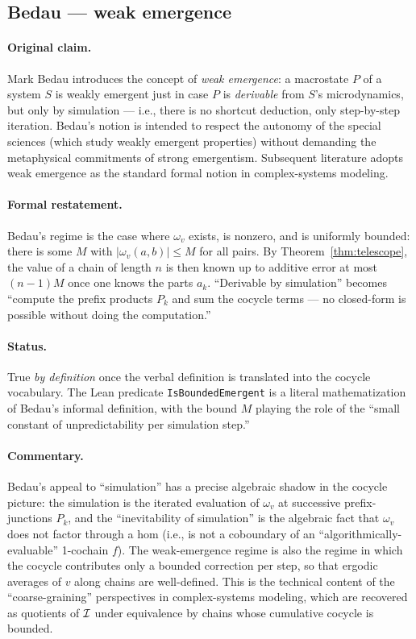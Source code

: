 \subsection{Bedau --- weak emergence}\label{sec:zoo:bedau}

\paragraph{Original claim.} Mark Bedau \cite{Bedau1997} introduces the
concept of \emph{weak emergence}: a macrostate $P$ of a system $S$ is
weakly emergent just in case $P$ is \emph{derivable} from $S$'s
microdynamics, but only by simulation --- i.e., there is no shortcut
deduction, only step-by-step iteration. Bedau's notion is intended to
respect the autonomy of the special sciences (which study weakly emergent
properties) without demanding the metaphysical commitments of strong
emergentism. Subsequent literature \cite{Holland1998} adopts weak
emergence as the standard formal notion in complex-systems modeling.

\paragraph{Formal restatement.} Bedau's regime is the case where $\omega_v$
exists, is nonzero, and is uniformly bounded: there is some $M$ with
$|\omega_v(a,b)| \le M$ for all pairs. By Theorem~\ref{thm:telescope},
the value of a chain of length $n$ is then known up to additive error at
most $(n-1)M$ once one knows the parts $a_k$. ``Derivable by simulation''
becomes ``compute the prefix products $P_k$ and sum the cocycle terms ---
no closed-form is possible without doing the computation.''

\paragraph{Status.} True \emph{by definition} once the verbal definition is
translated into the cocycle vocabulary. The Lean predicate
\texttt{IsBoundedEmergent} is a literal mathematization of Bedau's
informal definition, with the bound $M$ playing the role of the ``small
constant of unpredictability per simulation step.''

\paragraph{Commentary.} Bedau's appeal to ``simulation'' has a precise
algebraic shadow in the cocycle picture: the simulation is the iterated
evaluation of $\omega_v$ at successive prefix-junctions $P_k$, and the
``inevitability of simulation'' is the algebraic fact that $\omega_v$ does
not factor through a hom (i.e., is not a coboundary of an
``algorithmically-evaluable'' 1-cochain $f$). The weak-emergence regime is
also the regime in which the cocycle contributes only a bounded correction
per step, so that ergodic averages of $v$ along chains are well-defined.
This is the technical content of the ``coarse-graining'' perspectives in
complex-systems modeling, which are recovered as quotients of $\mathcal{I}$
under equivalence by chains whose cumulative cocycle is bounded.

